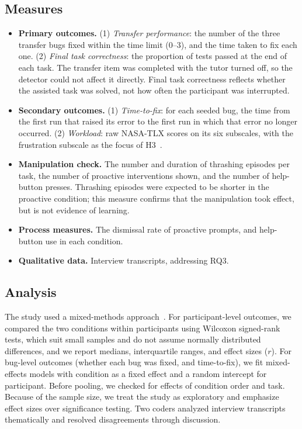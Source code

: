 \documentclass[manuscript,review]{acmart}
\begin{document}
\subsection{Measures}
\begin{itemize}
  \item \textbf{Primary outcomes.} (1) \emph{Transfer performance}: the number of the three transfer bugs fixed within the time limit (0--3), and the time taken to fix each one. (2) \emph{Final task correctness}: the proportion of tests passed at the end of each task. The transfer item was completed with the tutor turned off, so the detector could not affect it directly. Final task correctness reflects whether the assisted task was solved, not how often the participant was interrupted.
  \item \textbf{Secondary outcomes.} (1) \emph{Time-to-fix}: for each seeded bug, the time from the first run that raised its error to the first run in which that error no longer occurred. (2) \emph{Workload}: raw NASA-TLX scores on its six subscales, with the frustration subscale as the focus of H3~\cite{hart1988tlx}.
  \item \textbf{Manipulation check.} The number and duration of thrashing episodes per task, the number of proactive interventions shown, and the number of help-button presses. Thrashing episodes were expected to be shorter in the proactive condition; this measure confirms that the manipulation took effect, but is not evidence of learning.
  \item \textbf{Process measures.} The dismissal rate of proactive prompts, and help-button use in each condition.
  \item \textbf{Qualitative data.} Interview transcripts, addressing RQ3.
\end{itemize}

\subsection{Analysis}
The study used a mixed-methods approach~\cite{creswell2017mixed}. For participant-level outcomes, we compared the two conditions within participants using Wilcoxon signed-rank tests, which suit small samples and do not assume normally distributed differences, and we report medians, interquartile ranges, and effect sizes ($r$). For bug-level outcomes (whether each bug was fixed, and time-to-fix), we fit mixed-effects models with condition as a fixed effect and a random intercept for participant. Before pooling, we checked for effects of condition order and task. Because of the sample size, we treat the study as exploratory and emphasize effect sizes over significance testing. Two coders analyzed interview transcripts thematically and resolved disagreements through discussion.
\end{document}
